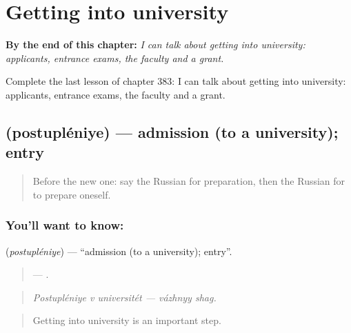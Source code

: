 
\chapter{Getting into university}
\label{ch:ru-getting-into-university}

\begin{chapteropening}
\textbf{By the end of this chapter:} \emph{I can talk about getting into university: applicants, entrance exams, the faculty and a grant.}

Complete the last lesson of chapter 383: I can talk about getting into university: applicants, entrance exams, the faculty and a grant.
\end{chapteropening}

\section[\texorpdfstring{\ru{поступление} (postupléniye)}{поступление (postupléniye)}]{ (postupléniye) — admission (to a university); entry}

\label{lesson:RU-C383-postuplenie}



\begin{quote}
Before the new one: say the Russian for preparation, then the Russian for to prepare oneself.
\end{quote}

\subsection*{You'll want to know: }
\textbf{} (\emph{postupléniye}) — \textquotedblleft{}admission (to a university); entry\textquotedblright{}.

\begin{quote}
   —  .
\end{quote}

\begin{quote}
\emph{Postupléniye v universitét — vázhnyy shag.}
\end{quote}

\begin{quote}
Getting into university is an important step.
\end{quote}

